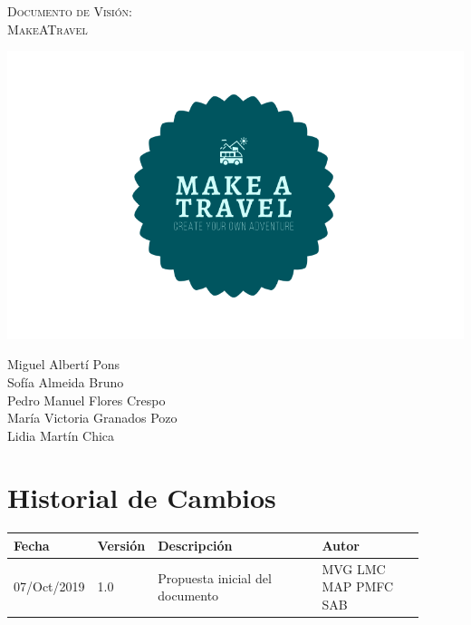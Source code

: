 \documentclass[11pt]{article}
\begin{document}
\begin{titlepage}
\centering
\vspace{4.5cm}
{\scshape\LARGE Documento de Visión:\\MakeATravel \par}
\vspace{1.5cm}

\includegraphics[width=16cm]{Logo}

\vspace{3cm}
{\scshape\large \par}
\vspace{1cm}

{Miguel Albertí Pons\\
Sofía Almeida Bruno\\
Pedro Manuel Flores Crespo\\
María Victoria Granados Pozo\\
Lidia Martín Chica
\par}

\end{titlepage}
\newpage

\section*{Historial de Cambios}
\begin{table}[H]
  \centering
  \begin{tabular}{p{0.15\linewidth}p{0.1\linewidth}p{0.4\linewidth}p{0.25\linewidth}}
    \toprule
    \textbf{Fecha} & \textbf{Versión} & \textbf{Descripción} & \textbf{Autor}\\
    \midrule
    07/Oct/2019 & 1.0 & Propuesta inicial del documento & MVG LMC MAP PMFC SAB\\
    \bottomrule
  \end{tabular}
\end{table}
\newpage
\end{document}
